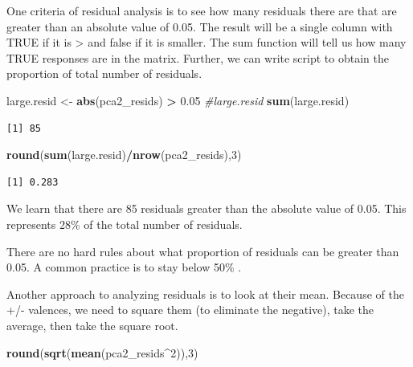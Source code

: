 \documentclass[
  english,
]{book}
\newenvironment{Shaded}{\begin{snugshade}}{\end{snugshade}}
\newcommand{\CommentTok}[1]{\textcolor[rgb]{0.56,0.35,0.01}{\textit{#1}}}
\newcommand{\DecValTok}[1]{\textcolor[rgb]{0.00,0.00,0.81}{#1}}
\newcommand{\FloatTok}[1]{\textcolor[rgb]{0.00,0.00,0.81}{#1}}
\newcommand{\KeywordTok}[1]{\textcolor[rgb]{0.13,0.29,0.53}{\textbf{#1}}}
\newcommand{\NormalTok}[1]{#1}
\newcommand{\OperatorTok}[1]{\textcolor[rgb]{0.81,0.36,0.00}{\textbf{#1}}}
\newcommand{\StringTok}[1]{\textcolor[rgb]{0.31,0.60,0.02}{#1}}
\begin{document}
One criteria of residual analysis is to see how many residuals there are that are greater than an absolute value of 0.05. The result will be a single column with TRUE if it is \textgreater{} \textbar{} and false if it is smaller. The sum function will tell us how many TRUE responses are in the matrix. Further, we can write script to obtain the proportion of total number of residuals.

\begin{Shaded}
\begin{Highlighting}[]
\NormalTok{large.resid <-}\StringTok{ }\KeywordTok{abs}\NormalTok{(pca2_resids) }\OperatorTok{>}\StringTok{ }\FloatTok{0.05}
\CommentTok{#large.resid}
\KeywordTok{sum}\NormalTok{(large.resid)}
\end{Highlighting}
\end{Shaded}

\begin{verbatim}
[1] 85
\end{verbatim}

\begin{Shaded}
\begin{Highlighting}[]
\KeywordTok{round}\NormalTok{(}\KeywordTok{sum}\NormalTok{(large.resid)}\OperatorTok{/}\KeywordTok{nrow}\NormalTok{(pca2_resids),}\DecValTok{3}\NormalTok{)}
\end{Highlighting}
\end{Shaded}

\begin{verbatim}
[1] 0.283
\end{verbatim}

We learn that there are 85 residuals greater than the absolute value of 0.05. This represents 28\% of the total number of residuals.

There are no hard rules about what proportion of residuals can be greater than 0.05. A common practice is to stay below 50\% \citep{field_discovering_2012}.

Another approach to analyzing residuals is to look at their mean. Because of the +/- valences, we need to square them (to eliminate the negative), take the average, then take the square root.

\begin{Shaded}
\begin{Highlighting}[]
\KeywordTok{round}\NormalTok{(}\KeywordTok{sqrt}\NormalTok{(}\KeywordTok{mean}\NormalTok{(pca2_resids}\OperatorTok{^}\DecValTok{2}\NormalTok{)),}\DecValTok{3}\NormalTok{)}
\end{Highlighting}
\end{Shaded}
\end{document}
